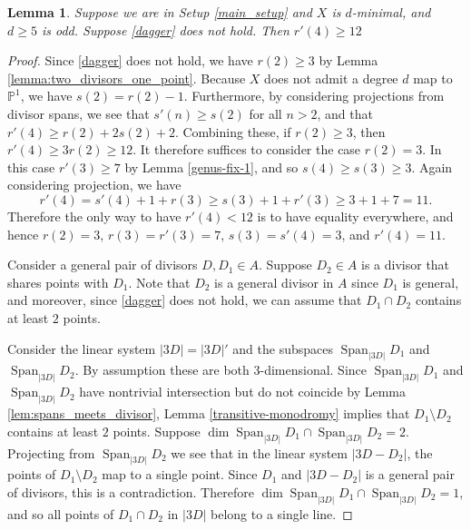 \documentclass[11pt]{amsart}
\newcommand{\pp}{\mathbb{P}}
\newcommand{\Span}{\operatorname{Span}}
\newtheorem{lemma}[theorem]{Lemma}
\theoremstyle{definition}
\theoremstyle{remark}
\begin{document}
\begin{lemma}\label{genus-fix-2}
Suppose we are in Setup \ref{main_setup} and $X$ is $d$-minimal, and $d \geqslant 5$ is odd. Suppose \eqref{dagger} does not hold. Then $r'(4) \geqslant 12$
\end{lemma}
\begin{proof}
Since \eqref{dagger} does not hold, we have $r(2)\geqslant 3$ by Lemma \ref{lemma:two_divisors_one_point}.
Because \(X\) does not admit a degree \(d\) map to \(\pp^1\), we have \(s(2) = r(2)-1\).  Furthermore, by considering projections from divisor spans, we see that \(s'(n) \geqslant s(2)\) for all $n>2$, and that \(r'(4) \geqslant r(2) + 2s(2)+2\).
Combining these, if $r(2)\geqslant 3$, then $r'(4) \geqslant 3r(2) \geqslant 12$. It therefore suffices to consider the case $r(2)=3$.  In this case $r'(3)\geqslant 7$ by Lemma \ref{genus-fix-1}, and so $s(4) \geqslant s(3) \geqslant 3$. 
Again considering projection, we have
\[r'(4) = s'(4) + 1 + r(3) \geqslant s(3) + 1 + r'(3) \geqslant 3 + 1 + 7 =11.\]
Therefore the only way to have $r'(4) < 12$ is to have equality everywhere, and hence $r(2)=3$, $r(3) = r'(3)=7$, $s(3)=s'(4)=3$, and $r'(4)=11$.

Consider a general pair of divisors $D, D_1 \in A$. Suppose $D_2\in A$ is a divisor that shares points with $D_1$.  Note that $D_2$ is a general divisor in $A$ since $D_1$ is general, and moreover, since \eqref{dagger} does not hold, we can assume that $D_1 \cap D_2$ contains at least $2$ points.

Consider the linear system $|3D| = |3D|'$ and the subspaces $\Span_{|3D|}D_1$ and $\Span_{|3D|} D_2$. By assumption these are both $3$-dimensional. Since $\Span_{|3D|}D_1$ and $\Span_{|3D|} D_2$ have nontrivial intersection but do not coincide by Lemma \ref{lem:spans_meets_divisor}, Lemma \ref{transitive-monodromy} implies that $D_1 \setminus D_2$ contains at least $2$ points. Suppose $\dim \Span_{|3D|}D_1 \cap \Span_{|3D|}D_2 = 2$. Projecting from $\Span_{|3D|}D_2$ we see that in the linear system $|3D-D_2|$, the points of $D_1 \setminus D_2$ map to a single point. Since $D_1$ and $|3D-D_2|$ is a general pair of divisors, this is a contradiction. Therefore $\dim \Span_{|3D|}D_1 \cap \Span_{|3D|}D_2 = 1$, and so all points of $D_1 \cap D_2$ in $|3D|$ belong to a single line.


\end{proof}
\end{document}
